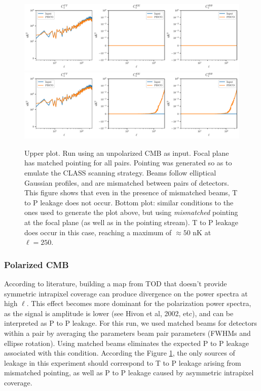 \documentclass[a4paper,11pt]{article}
\begin{document}
\begin{figure}
	\centering
	\includegraphics[width=1.0\linewidth]{figures/unpolCMB_r0d00_CLASS_matchedPointing_mismatchedBeams_ellipticalBeams.pdf}
	\includegraphics[width=1.0\linewidth]{figures/unpolCMB_r0d00_CLASS_mismatchedPointing_mismatchedBeams_ellipticalBeams.pdf}
	\caption{Upper plot. Run using an unpolarized CMB as input. Focal plane has matched pointing for all pairs. Pointing was generated so as to emulate the CLASS scanning strategy. Beams follow elliptical Gaussian profiles, and are mismatched between pairs of detectors. This figure shows that even in the presence of mismatched beams, T to P leakage does not occur. Bottom plot: similar conditions to the ones used to generate the plot above, but using \textsl{mismatched} pointing at the focal plane (as well as in the pointing stream). T to P leakage does occur in this case, reaching a maximum of $\approx 50$ nK at $\ell = 250$.}
	\label{fig::unpolcmbr0}
\end{figure}

\subsubsection{Polarized CMB}

According to literature, building a map from TOD that doesn't provide symmetric intrapixel coverage can produce divergence on the power spectra at high $\ell$. This effect becomes more dominant for the polarization power spectra, as the signal is amplitude is lower (see Hivon et al, 2002, etc), and can be interpreted as P to P leakage. For this run, we used matched beams for detectors within a pair by averaging the parameters beam pair parameters (FWHMs and ellipse rotation). Using matched beams eliminates the expected P to P leakage associated with this condition. According the Figure \ref{fig::unpolcmbr0}, the only sources of leakage in this experiment should correspond to T to P leakage arising from mismatched pointing, as well as P to P leakage caused by asymmetric intrapixel coverage. 
\end{document}
